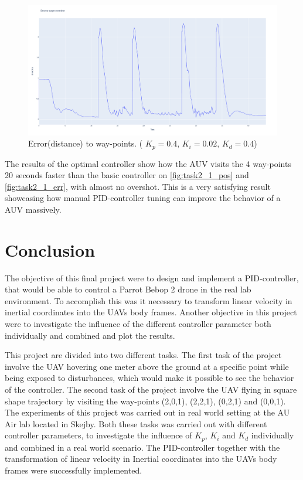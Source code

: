 \documentclass[conference]{IEEEtran}
\begin{document}
\begin{figure}[hbtp]
	\centering
	\includegraphics[width=1.0\linewidth]{images/task2_6_err.png}
	\caption{Error(distance) to way-points. ( $K_p = 0.4$, $K_i = 0.02$, $K_d = 0.4$)}
	\label{fig:task2_6_err}
\end{figure}

The results of the optimal controller show how the AUV visits the 4 way-points 20 seconds faster than the basic controller on \cref{fig:task2_1_pos} and \cref{fig:task2_1_err}, with almost no overshot. This is a very satisfying result showcasing how manual PID-controller tuning can improve the behavior of a AUV massively.  

\section{Conclusion}
The objective of this final project were to design and implement a PID-controller, that would be able to control a Parrot Bebop 2 drone in the real lab environment. To accomplish this was it necessary to transform linear velocity in inertial coordinates into the UAVs body frames. Another objective in this project were to investigate the influence of the different controller parameter both individually and combined and plot the results. 

This project are divided into two different tasks. The first task of the project involve the UAV hovering one meter above the ground at a specific point while being exposed to disturbances, which would make it possible to see the behavior of the controller. The second task of the project involve the UAV flying in square shape trajectory by visiting the way-points (2,0,1), (2,2,1), (0,2,1) and (0,0,1). The experiments of this project was carried out in real world setting at the AU Air lab located in Skejby. Both these tasks was carried out with different controller parameters, to investigate the influence of $K_p$, $K_i$ and $K_d$ individually and combined in a real world scenario. The PID-controller together with the transformation of linear velocity in Inertial coordinates into the UAVs body frames were successfully implemented.
\end{document}
